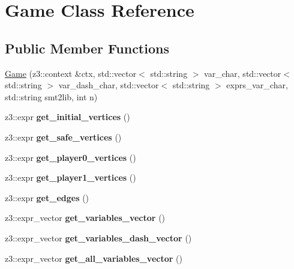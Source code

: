 \hypertarget{classGame}{}\section{Game Class Reference}
\label{classGame}
\subsection*{Public Member Functions}
\begin{DoxyCompactItemize}
\item 
\hyperlink{classGame_a1ae88a7d6500fc7a81bb3880cb474cac}{Game} (z3\+::context \&ctx, std\+::vector$<$ std\+::string $>$ var\+\_\+char, std\+::vector$<$ std\+::string $>$ var\+\_\+dash\+\_\+char, std\+::vector$<$ std\+::string $>$ exprs\+\_\+var\+\_\+char, std\+::string smt2lib, int n)
\item 
\mbox{\label{classGame_afd949c6a35db3fbcdc8179756b64508d}} 
z3\+::expr {\bfseries get\+\_\+initial\+\_\+vertices} ()
\item 
\mbox{\label{classGame_aec1f8c4d7631011de0b662d4803f7bf6}} 
z3\+::expr {\bfseries get\+\_\+safe\+\_\+vertices} ()
\item 
\mbox{\label{classGame_a6cfdd0807fa2a55342e5a60da1051973}} 
z3\+::expr {\bfseries get\+\_\+player0\+\_\+vertices} ()
\item 
\mbox{\label{classGame_a46a04d741f3bc1a6d31580248a37368f}} 
z3\+::expr {\bfseries get\+\_\+player1\+\_\+vertices} ()
\item 
\mbox{\label{classGame_a82cc1c9bf325c497538c61a7e75e35e2}} 
z3\+::expr {\bfseries get\+\_\+edges} ()
\item 
\mbox{\label{classGame_af63ba8c0eed410040b262196747602c1}} 
z3\+::expr\+\_\+vector {\bfseries get\+\_\+variables\+\_\+vector} ()
\item 
\mbox{\label{classGame_a4a88d4eb5b82e90a567eb85e87e89b54}} 
z3\+::expr\+\_\+vector {\bfseries get\+\_\+variables\+\_\+dash\+\_\+vector} ()
\item 
\mbox{\label{classGame_a969b1ec48d650af2e79ba26d86ea094b}} 
z3\+::expr\+\_\+vector {\bfseries get\+\_\+all\+\_\+variables\+\_\+vector} ()

\end{DoxyCompactItemize}
